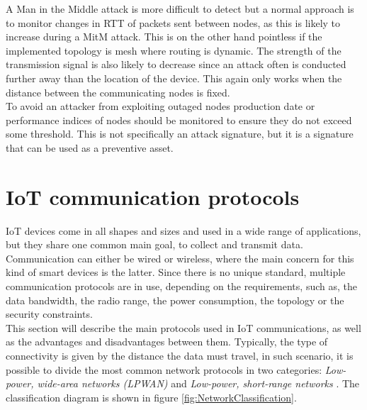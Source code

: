 A Man in the Middle attack is more difficult to detect but a normal approach is to monitor changes in RTT of packets sent between nodes, as this is likely to increase during a MitM attack. This is on the other hand pointless if the implemented topology is mesh where routing is dynamic. The strength of the transmission signal is also likely to decrease since an attack often is conducted further away than the location of the device. This again only works when the distance between the communicating nodes is fixed. \\

To avoid an attacker from exploiting outaged nodes production date or performance indices of nodes should be monitored to ensure they do not exceed some threshold. This is not specifically an attack signature, but it is a signature that can be used as a preventive asset. 













\section{IoT communication protocols}

IoT devices come in all shapes and sizes and used in a wide range of applications, but they share one common main goal, to collect and transmit data. Communication can either be wired or wireless, where the main concern for this kind of smart devices is the latter. Since there is no unique standard, multiple communication protocols are in use, depending on the requirements, such as, the data bandwidth, the radio range, the power consumption, the  topology or the security constraints. \\

This section will describe the main protocols used in IoT communications, as well as the advantages and disadvantages between them. Typically, the type of connectivity is given by the distance the data must travel, in such scenario, it is possible to divide the most common network protocols in two categories: \textit{Low-power, wide-area networks (LPWAN)} and \textit{Low-power, short-range networks} \cite{Microsoft:protocols}. The classification diagram is shown in figure \ref{fig:NetworkClassification}.



